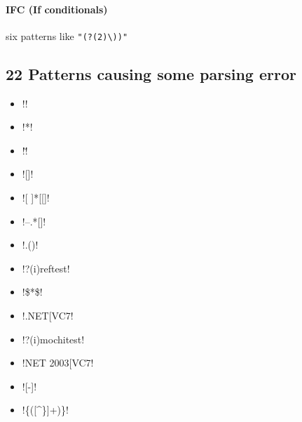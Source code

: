 \paragraph{IFC (If conditionals)} six patterns like \verb!"(?(2)\))"!
\begin{itemize}[noitemsep,topsep=0pt]
\item \cverb!^(\()?([^()]+)(?(1)\))$!
\item \cverb@(?<=[\w)\]"\']|([ ]))(===?|!==?|[<>]=?)(?=[\w({\["\']|(?(1)\b\b|[ ]))@
\item \cverb!(?<=[\w)\]"\']|([ ]))(=|[-+*/%
\item \cverb!(?<=[\w)\]"\']|([ ]))([-+*/%
\item \cverb!([^()]+?)\s*(\()?(\d{4})(?(2)\))$!
\item \cverb@^((?:https?://)?(?:youtu\\.be/|(?:\\w+\\.)?youtube(?:-nocookie@\verb!...<117>!
\end{itemize}

\subsection*{22 Patterns causing some parsing error}
\begin{multicols}{2}
\begin{itemize}[noitemsep,topsep=0pt]
\item \cverb!!
\item \cverb!*!
\item \cverb!\u!
\item \cverb![]!
\item \cverb![ \n]*[[]!
\item \cverb!--.*[\n\Z]!
\item \cverb!\here.(\w*)!
\item \cverb!?(i)reftest!
\item \cverb!\$\Id[^$]*\$!
\item \cverb!.NET[\/\]VC7!
\item \cverb!?(i)mochitest!
\item \cverb!NET 2003[\/\]VC7!
\item \cverb![-\udfff]!
\item \cverb!\citation\{([^\}]+)\}!
\end{itemize}
\end{multicols}

